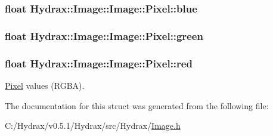 \hypertarget{struct_hydrax_1_1_image_1_1_pixel_f27e1b75fc1935a62f3af20bc8f81eae}{
\subsubsection[{blue}]{\setlength{\rightskip}{0pt plus 5cm}float Hydrax::Image::Image::Pixel::blue}}
\label{struct_hydrax_1_1_image_1_1_pixel_f27e1b75fc1935a62f3af20bc8f81eae}


\hypertarget{struct_hydrax_1_1_image_1_1_pixel_615a2726f584af197d21dbaa724631e0}{
\subsubsection[{green}]{\setlength{\rightskip}{0pt plus 5cm}float Hydrax::Image::Image::Pixel::green}}
\label{struct_hydrax_1_1_image_1_1_pixel_615a2726f584af197d21dbaa724631e0}


\hypertarget{struct_hydrax_1_1_image_1_1_pixel_4a09b94547a9b223e80314cd1f2cd152}{
\subsubsection[{red}]{\setlength{\rightskip}{0pt plus 5cm}float Hydrax::Image::Image::Pixel::red}}
\label{struct_hydrax_1_1_image_1_1_pixel_4a09b94547a9b223e80314cd1f2cd152}


\hyperlink{struct_hydrax_1_1_image_1_1_pixel}{Pixel} values (RGBA). 



The documentation for this struct was generated from the following file:\begin{CompactItemize}
\item 
C:/Hydrax/v0.5.1/Hydrax/src/Hydrax/\hyperlink{_image_8h}{Image.h}\end{CompactItemize}
